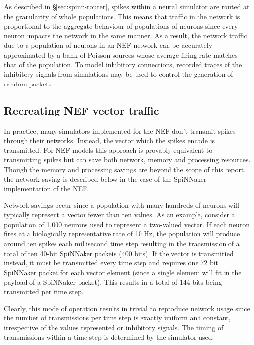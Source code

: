 			As described in \S\ref{sec:spinn-router}, spikes within a neural simulator
			are routed at the granularity of whole populations. This means that
			traffic in the network is proportional to the aggregate behaviour of
			populations of neurons since every neuron impacts the network in the same
			manner. As a result, the network traffic due to a population of neurons in
			an NEF network can be accurately approximated by a bank of Poisson sources
			whose average firing rate matches that of the population. To model
			inhibitory connections, recorded traces of the inhibitory signals from
			simulations may be used to control the generation of random packets.
		
		\subsection{Recreating NEF vector traffic}
			
			In practice, many simulators implemented for the NEF don't transmit spikes
			through their networks. Instead, the vector which the spikes encode is
			transmitted. For NEF models this approach is provably equivalent to
			transmitting spikes but can save both network, memory and processing
			resources. Though the memory and processing savings are beyond the scope
			of this report, the network saving is described below in the case of the
			SpiNNaker implementation of the NEF.
			
			Network savings occur since a population with many hundreds of neurons
			will typically represent a vector fewer than ten values. As an example,
			consider a population of 1,000 neurons used to represent a two-valued
			vector. If each neuron fires at a biologically representative rate of 10
			Hz, the population will produce around ten spikes each millisecond time
			step resulting in the transmission of a total of ten 40-bit SpiNNaker
			packets (400 bits). If the vector is transmitted instead, it must be
			transmitted every time step and requires one 72 bit SpiNNaker packet for
			each vector element (since a single element will fit in the payload of a
			SpiNNaker packet). This results in a total of 144 bits being transmitted
			per time step.
			
			Clearly, this mode of operation results in trivial to reproduce network
			usage since the number of transmissions per time step is exactly uniform
			and constant, irrespective of the values represented or inhibitory
			signals. The timing of transmissions within a time step is determined by
			the simulator used.
			
